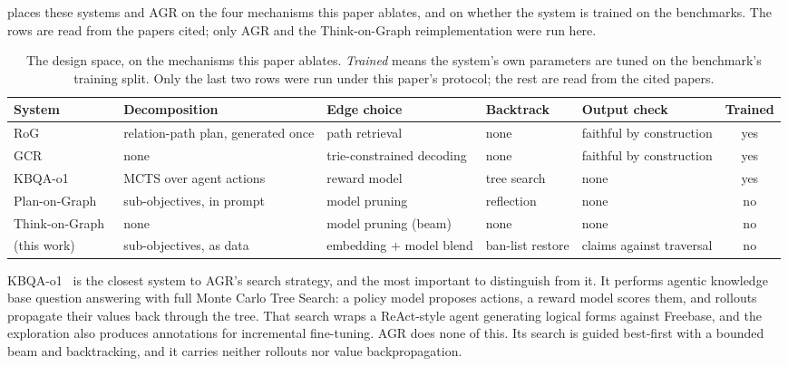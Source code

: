  places these systems and AGR on the four
mechanisms this paper ablates, and on whether the system is trained on
the benchmarks. The rows are read from the papers cited; only AGR and
the Think-on-Graph reimplementation were run here.

\begin{table}[!tb]
  \begin{center}
    \caption{The design space, on the mechanisms this paper ablates.
      \emph{Trained} means the system's own parameters are tuned on the
      benchmark's training split. Only the last two rows were run under
      this paper's protocol; the rest are read from the cited papers.}
    \label{tab:designspace}
    \scriptsize
    \setlength{\tabcolsep}{3pt}
    \begin{tabular}{|l|L{20mm}|L{20mm}|L{17mm}|L{22mm}|c|}
      \hline
      \textbf{System} & \textbf{Decom\-position} & \textbf{Edge choice}
        & \textbf{Backtrack} & \textbf{Output check} & \textbf{Trained} \\
      \hline
      RoG~\cite{luo2024reasoning} & relation-path plan, generated once
        & path retrieval & none & faithful by construction & yes \\
      GCR~\cite{luo2025gcr} & none & trie-constrained decoding & none
        & faithful by construction & yes \\
      KBQA-o1~\cite{luo2025kbqao1} & MCTS over agent actions
        & reward model & tree search & none & yes \\
      Plan-on-Graph~\cite{chen2024plan} & sub-objectives, in prompt
        & model pruning & reflection & none & no \\
      Think-on-Graph~\cite{sun2024think} & none & model pruning (beam)
        & none & none & no \\
      \agr{} (this work) & sub-objectives, as data
        & embedding $+$ model blend & ban-list restore
        & claims against traversal & no \\
      \hline
    \end{tabular}
  \end{center}
\end{table}

KBQA-o1~\cite{luo2025kbqao1} is the closest system to AGR's search
strategy, and the most important to distinguish from it. It performs
agentic knowledge base question answering with full Monte Carlo Tree
Search: a policy model proposes actions, a reward model scores them, and
rollouts propagate their values back through the tree. That search wraps
a ReAct-style agent generating logical forms against Freebase, and the
exploration also produces annotations for incremental fine-tuning. AGR
does none of this. Its search is guided best-first with a bounded beam
and backtracking, and it carries neither rollouts nor value
backpropagation.

